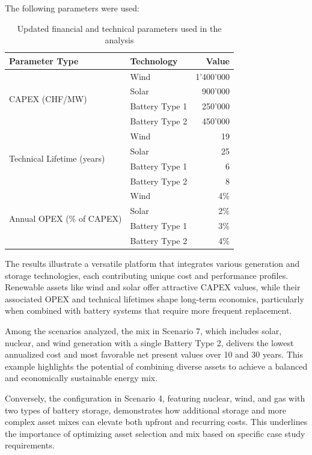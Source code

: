 The following parameters were used: 
 \begin{table}[h]
    \centering
    \begin{tabular}{l l r}
    \hline
    \textbf{Parameter Type} & \textbf{Technology} & \textbf{Value}  \\
    \hline
    \multirow{4}{*}{CAPEX (CHF/MW)} 
        & Wind & 1'400'000 \\
        & Solar & 900'000 \\
        & Battery Type 1 & 250'000 \\
        & Battery Type 2 & 450'000 \\
    \hline
    \multirow{4}{*}{Technical Lifetime (years)}
        & Wind & 19 \\
        & Solar & 25 \\
        & Battery Type 1 & 6 \\
        & Battery Type 2 & 8 \\
    \hline
    \multirow{4}{*}{Annual OPEX (\% of CAPEX)}
        & Wind & 4\% \\
        & Solar & 2\% \\
        & Battery Type 1 & 3\% \\
        & Battery Type 2 & 4\% \\
    \hline
    \end{tabular}
    \caption{Updated financial and technical parameters used in the analysis}
    \label{tab:updated_parameters}
    \end{table}

The results illustrate a versatile platform that integrates various generation and storage technologies,
each contributing unique cost and performance profiles. Renewable assets like wind and solar offer 
attractive CAPEX values, while their associated OPEX and technical lifetimes shape long-term economics,
particularly when combined with battery systems that require more frequent replacement.

Among the scenarios analyzed, the mix in Scenario 7, which includes solar, nuclear, and wind generation 
with a single Battery Type 2, delivers the lowest annualized cost and most favorable net present values
over 10 and 30 years. This example highlights the potential of combining diverse assets to achieve a 
balanced and economically sustainable energy mix.
    
Conversely, the configuration in Scenario 4, featuring nuclear, wind, and gas with two types of battery
storage, demonstrates how additional storage and more complex asset mixes can elevate both upfront and 
recurring costs. This underlines the importance of optimizing asset selection and mix based on specific
case study requirements.
    
